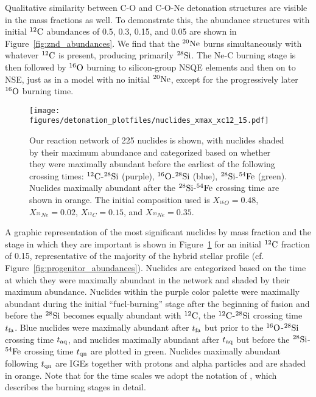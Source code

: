 \documentclass[iop,apj]{emulateapj}
\newcommand{\figref}[1]{Figure~\ref{#1}}
\newcommand{\C}[1]{\ensuremath{{}^{#1}{\rm C}}}
\newcommand{\Ox}[1]{\ensuremath{{}^{#1}{\rm O}}}
\newcommand{\Ne}[1]{\ensuremath{{}^{#1}{\rm Ne}}}
\newcommand{\Si}[1]{\ensuremath{{}^{#1}{\rm Si}}}
\newcommand{\Fe}[1]{\ensuremath{{}^{#1}{\rm Fe}}}
\begin{document}
Qualitative similarity between C-O and C-O-Ne detonation structures
are visible in the mass fractions as well.
To demonstrate this, the abundance structures with initial \C{12} abundances of 0.5, 0.3,
0.15, and 0.05 are shown in \figref{fig:znd_abundances}. 
We find that the \Ne{20} burns simultaneously with whatever \C{12} is present,
producing primarily \Si{28}.  The Ne-C burning stage is then followed by \Ox{16}
burning to silicon-group NSQE elements and then on to NSE,
just as in a model with no initial \Ne{20}, except for the progressively
later \Ox{16} burning time.


\begin{figure}[t]
	\texttt{[image: figures/detonation\_plotfiles/nuclides\_xmax\_xc12\_15.pdf]}
	\caption{\label{fig:nuclides_xmax} Our reaction network of 225 nuclides is shown, with nuclides shaded by their maximum abundance and categorized based on whether they were maximally abundant before the earliest of the following crossing times: \C{12}-\Si{28} (purple), \Ox{16}-\Si{28} (blue), \Si{28}-\Fe{54} (green). Nuclides maximally abundant after the \Si{28}-\Fe{54} crossing time are shown in orange.
		The initial composition used 
		is $X_{^{16}O} = 0.48$, $X_{^{22}Ne} = 0.02$, $X_{^{12}C} = 0.15$, and $X_{^{20}Ne} = 0.35$.
	}
\end{figure}

A graphic representation of the most significant nuclides by mass
fraction and the stage in which they are important is shown in
\figref{fig:nuclides_xmax} for an initial \C{12} fraction of 0.15,
representative of the majority of the hybrid stellar profile
(cf. \figref{fig:progenitor_abundances}). Nuclides are categorized
based on the time at which they were maximally abundant in the network
and shaded by their maximum abundance.  Nuclides within the purple
color palette were maximally abundant during the initial
``fuel-burning'' stage after the beginning of fusion and before the
\Si{28} becomes equally abundant with \C{12}, the \C{12}-\Si{28}
crossing time $t_{\rm fa}$.  Blue nuclides were maximally abundant
after $t_{\rm fa}$ but prior to the \Ox{16}-\Si{28} crossing time
$t_{\rm aq}$, and nuclides maximally abundant after $t_{\rm aq}$ but
before the \Si{28}-\Fe{54} crossing time $t_{\rm qn}$ are plotted in
green. Nuclides maximally abundant following $t_{\rm qn}$ are IGEs
together with protons and alpha particles and are shaded in
orange. Note that for the time scales we adopt the notation of
\citep{townetal15}, which describes the burning stages in detail.
\end{document}
